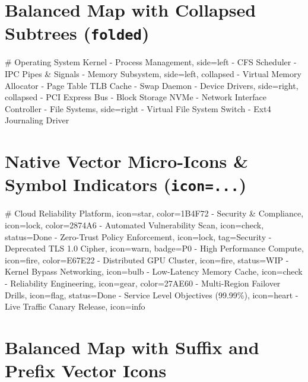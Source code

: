 \documentclass{article}
\begin{document}
\vspace{1cm}

\section*{Balanced Map with Collapsed Subtrees (\texttt{folded})}

\begin{mindchart}[theme=nord, layout=balanced, style=underline, line=curve, scale=0.60]
# Operating System Kernel
  - Process Management, side=left
    - CFS Scheduler
    - IPC Pipes \& Signals
  - Memory Subsystem, side=left, collapsed
    - Virtual Memory Allocator
    - Page Table TLB Cache
    - Swap Daemon
  - Device Drivers, side=right, collapsed
    - PCI Express Bus
    - Block Storage NVMe
    - Network Interface Controller
  - File Systems, side=right
    - Virtual File System Switch
    - Ext4 Journaling Driver
\end{mindchart}

\newpage

\section*{Native Vector Micro-Icons \& Symbol Indicators (\texttt{icon=...})}

\begin{mindchart}[theme=rainbow, layout=right, style=classic, line=tapered, scale=0.68]
# Cloud Reliability Platform, icon=star, color=1B4F72
  - Security \& Compliance, icon=lock, color=2874A6
    - Automated Vulnerability Scan, icon=check, status=Done
    - Zero-Trust Policy Enforcement, icon=lock, tag=Security
    - Deprecated TLS 1.0 Cipher, icon=warn, badge=P0
  - High Performance Compute, icon=fire, color=E67E22
    - Distributed GPU Cluster, icon=fire, status=WIP
    - Kernel Bypass Networking, icon=bulb
    - Low-Latency Memory Cache, icon=check
  - Reliability Engineering, icon=gear, color=27AE60
    - Multi-Region Failover Drills, icon=flag, status=Done
    - Service Level Objectives (99.99\%), icon=heart
    - Live Traffic Canary Release, icon=info
\end{mindchart}

\vspace{1cm}

\section*{Balanced Map with Suffix and Prefix Vector Icons}
\end{document}
